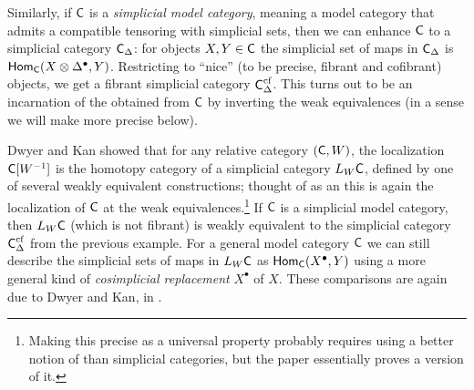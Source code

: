\documentclass[a4paper,11pt]{article}
\begin{document}
\begin{ex}
  Similarly, if $\textup{\textsf{C}}$ is a \emph{simplicial model category}, meaning a
  model category that admits a compatible tensoring with simplicial
  sets, then we can enhance $\textup{\textsf{C}}$ to a simplicial category
  $\textup{\textsf{C}}_{\Delta}$: for objects $X,Y \in \textup{\textsf{C}}$ the simplicial set of maps
  in $\textup{\textsf{C}}_{\Delta}$ is $\textup{\textsf{Hom}}_{\textup{\textsf{C}}}(X \otimes \Delta^{\bullet},
  Y)$. Restricting to ``nice'' (to be precise, fibrant and cofibrant)
  objects, we get a fibrant simplicial category
  $\textup{\textsf{C}}_{\Delta}^{\mathrm{cf}}$. This turns out to be an incarnation of
  the \icat{} obtained from $\textup{\textsf{C}}$ by inverting the weak equivalences
  (in a sense we will make more precise below).
\end{ex}

\begin{ex}
  Dwyer and Kan \cite{DwyerKan1,DwyerKan2} showed that for any
  relative category $(\textup{\textsf{C}}, W)$, the localization $\textup{\textsf{C}}[W^{-1}]$ is the
  homotopy category of a simplicial category $L_{W}\textup{\textsf{C}}$, defined by
  one of several weakly equivalent constructions; thought of as an
  \icat{} this is again the \icatl{} localization of $\textup{\textsf{C}}$ at the weak
  equivalences.\footnote{Making this precise as a universal property
    probably requires using a better notion of \icats{} than
    simplicial categories, but the paper \cite{DwyerKanDiag}
    essentially proves a version of it.}  If $\textup{\textsf{C}}$ is a simplicial
  model category, then $L_{W}\textup{\textsf{C}}$ (which is not fibrant) is weakly
  equivalent to the simplicial category $\textup{\textsf{C}}_{\Delta}^{\mathrm{cf}}$
  from the previous example.  For a general model category $\textup{\textsf{C}}$ we
  can still describe the simplicial sets of maps in $L_{W}\textup{\textsf{C}}$ as
  $\textup{\textsf{Hom}}_{\textup{\textsf{C}}}(X^{\bullet}, Y)$ using a more general kind of
  \emph{cosimplicial replacement} $X^{\bullet}$ of $X$. These
  comparisons are again due to Dwyer and Kan, in \cite{DwyerKan3}.
\end{ex}
\end{document}
